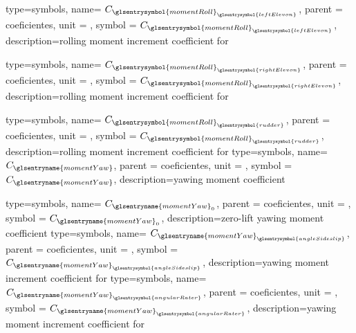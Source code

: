 {type=symbols,
    name= \ensuremath{C_{{\glsentrysymbol{momentRoll}}_{\glsentrysymbol{leftElevon}}}},
    parent = {coeficientes},
    unit = \unexpanded{},
    symbol = \ensuremath{C_{{\glsentrysymbol{momentRoll}}_{\glsentrysymbol{leftElevon}}}},
    description={rolling moment increment coefficient for }
}

{type=symbols,
    name= \ensuremath{C_{{\glsentrysymbol{momentRoll}}_{\glsentrysymbol{rightElevon}}}},
    parent = {coeficientes},
    unit = \unexpanded{},
    symbol = \ensuremath{C_{{\glsentrysymbol{momentRoll}}_{\glsentrysymbol{rightElevon}}}},
    description={rolling moment increment coefficient for }
}



{type=symbols,
    name= \ensuremath{C_{{\glsentrysymbol{momentRoll}}_{\glsentrysymbol{rudder}}}},
    parent = {coeficientes},
    unit = \unexpanded{},
    symbol = \ensuremath{C_{{\glsentrysymbol{momentRoll}}_{\glsentrysymbol{rudder}}}},
    description={rolling moment increment coefficient for }
}
{type=symbols,
    name= \ensuremath{C_\glsentryname{momentYaw}},
    parent = {coeficientes},
    unit = \unexpanded{},
    symbol = \ensuremath{C_\glsentryname{momentYaw}},
    description={yawing moment coefficient}
}

{type=symbols,
    name= \ensuremath{C_{\glsentryname{momentYaw}_{0}}},
    parent = {coeficientes},
    unit = \unexpanded{},
    symbol = \ensuremath{C_{\glsentryname{momentYaw}_{0}}},
    description={zero-lift yawing moment coefficient}
}
{type=symbols,
    name= \ensuremath{C_{{\glsentryname{momentYaw}}_{\glsentrysymbol{angleSideslip}}}},
    parent = {coeficientes},
    unit = \unexpanded{},
    symbol = \ensuremath{C_{{\glsentryname{momentYaw}}_{\glsentrysymbol{angleSideslip}}}},
    description={yawing moment increment coefficient for }
}
{type=symbols,
    name= \ensuremath{C_{{\glsentryname{momentYaw}}_{\glsentrysymbol{angularRater}}}},
    parent = {coeficientes},
    unit = \unexpanded{},
    symbol = \ensuremath{C_{{\glsentryname{momentYaw}}_{\glsentrysymbol{angularRater}}}},
    description={yawing moment increment coefficient for }
}

